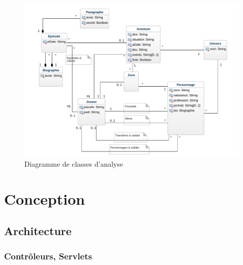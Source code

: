 \documentclass[a4paper, 11pt, titlepage]{article}
\begin{document}
\begin{figure}[ht!]
\includegraphics[scale=0.7]{analyse/classes.pdf}
\caption{Diagramme de classes d'analyse}
\end{figure}








\newpage

\section {Conception}

\subsection {Architecture}

\subsubsection {Contrôleurs, Servlets}
\end{document}
